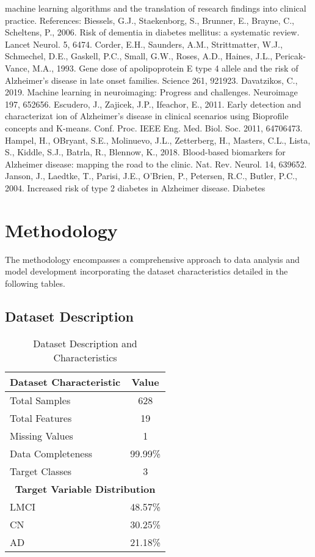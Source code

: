 \documentclass[conference]{IEEEtran}
\begin{document}
machine learning algorithms and the translation of research findings into clinical practice. References: Biessels, G.J., Staekenborg, S., Brunner, E., Brayne, C., Scheltens, P., 2006. Risk of dementia in diabetes mellitus: a systematic review. Lancet Neurol. 5, 6474. Corder, E.H., Saunders, A.M., Strittmatter, W.J., Schmechel, D.E., Gaskell, P.C., Small, G.W., Roses, A.D., Haines, J.L., Pericak-Vance, M.A., 1993. Gene dose of apolipoprotein E type 4 allele and the risk of Alzheimer's disease in late onset families. Science 261, 921923. Davatzikos, C., 2019. Machine learning in neuroimaging: Progress and challenges. Neuroimage 197, 652656. Escudero, J., Zajicek, J.P., Ifeachor, E., 2011. Early detection and characterizat ion of Alzheimer's disease in clinical scenarios using Bioprofile concepts and K-means. Conf. Proc. IEEE Eng. Med. Biol. Soc. 2011, 64706473. Hampel, H., OBryant, S.E., Molinuevo, J.L., Zetterberg, H., Masters, C.L., Lista, S., Kiddle, S.J., Batrla, R., Blennow, K., 2018. Blood-based biomarkers for Alzheimer disease: mapping the road to the clinic. Nat. Rev. Neurol. 14, 639652. Janson, J., Laedtke, T., Parisi, J.E., O'Brien, P., Petersen, R.C., Butler, P.C., 2004. Increased risk of type 2 diabetes in Alzheimer disease. Diabetes

\section{Methodology}
The methodology encompasses a comprehensive approach to data analysis and model development incorporating the dataset characteristics detailed in the following tables.

\subsection{Dataset Description}

\begin{table}[!h]
\centering
\caption{Dataset Description and Characteristics}
\label{tab:dataset_description}
\begin{tabular}{|l|c|}
\hline
\textbf{Dataset Characteristic} & \textbf{Value} \\
\hline
Total Samples & 628 \\
\hline
Total Features & 19 \\
\hline
Missing Values & 1 \\
\hline
Data Completeness & 99.99\% \\
\hline
Target Classes & 3 \\
\hline
\hline
\multicolumn{2}{|c|}{\textbf{Target Variable Distribution}} \\
\hline
LMCI & 48.57\% \\
\hline
CN & 30.25\% \\
\hline
AD & 21.18\% \\
\hline
\end{tabular}
\end{table}
\end{document}
